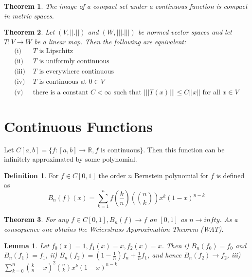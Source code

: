 \documentclass{article}
\newtheorem{theorem}{Theorem}[section]
\newtheorem{lemma}{Lemma}[section]
\theoremstyle{definition}
\newtheorem{definition}{Definition}[section]
\begin{document}
    \begin{theorem}
        The image of a compact set under a continuous function is compact in metric spaces.
    \end{theorem}

    \begin{theorem}
        Let $(V, ||.||)$ and $(W, |||.|||)$ be normed vector spaces and let $T:V \rightarrow W$ be a linear map. Then the 
        following are equivalent:
        \begin{align*}
            \text{(i) } & \text{$T$ is Lipschitz} \\
            \text{(ii) } & \text{$T$ is uniformly continuous}\\
            \text{(iii) } & \text{$T$ is everywhere continuous}\\
            \text{(iv) } & \text{$T$ is continuous at $0 \in V$}\\
            \text{(v) } & \text{there is a constant $C < \infty$ such that $|||T(x)||| \leqslant C||x||$ for all $x \in V$}
        \end{align*}
    \end{theorem}

\section{Continuous Functions}
    Let $C[a,b] = \{ f : [a,b] \rightarrow \mathbb{R}, f\text{ is continuous}\}$.
    Then this function can be infinitely approximated by some polynomial.
    \begin{definition}
        For $f \in C[0,1]$ the order $n$ Bernstein polynomial for $f$ is defined as
        \[
            B_n(f)(x) = \sum_{k=1}^n f(\frac{k}{n}) ({n \choose k}) x^k (1-x)^{n - k}
        \]
    \end{definition}
    \begin{theorem}
        For any $f \in C[0,1], B_n(f) \rightarrow f$ on $[0,1]$ as $n \rightarrow infty$.
        As a consequence one obtains the Weierstrass Approximation Theorem (WAT).
    \end{theorem}
    \begin{lemma}
        Let $f_0(x) = 1, f_1(x) = x, f_2(x) = x$. Then i) $B_n(f_0) = f_0$ and $B_n(f_1) = f_1$,
        ii) $B_n(f_2) = (1-  \frac{1}{n}) f_n + \frac{1}{n} f_1$, and hence $B_n(f_2) \rightarrow f_2$,
        iii) $\sum_{k=0}^n (\frac{k}{n} - x)^2 {n \choose k} x^k (1 - x)^{n - k}$
    \end{lemma}
    
\end{document}
